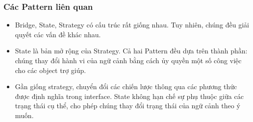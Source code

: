 \subsubsection{Các Pattern liên quan}
\begin{itemize}
    \item Bridge, State, Strategy có cấu trúc rất giống nhau. Tuy nhiên, chúng đều giải quyết các vấn đề khác nhau.
    \item State là bản mở rộng của Strategy. Cả hai Pattern đều dựa trên thành phần: chúng thay đổi hành vi của ngữ cảnh bằng cách ủy quyền một số công việc cho các object trợ giúp.
    \item Gần giống strategy, chuyển đổi các chiến lược thông qua các phương thức được định nghĩa trong interface. State không hạn chế sự phụ thuộc giữa các trạng thái cụ thể, cho phép chúng thay đổi trạng thái của ngữ cảnh theo ý muốn.
\end{itemize}


